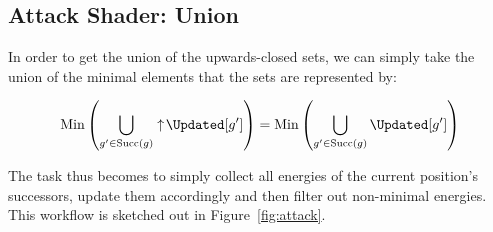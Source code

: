 \subsection{Attack Shader: Union}\label{subsec:attack_shader}

In order to get the union of the upwards-closed sets,
we can simply take the union of the minimal elements
that the sets are represented by:

\[\mathrm{Min} \left( \bigcup_{g' \in \mathrm{Succ}(g)} \upclosed \Updated[g'] \right) =
  \mathrm{Min} \left( \bigcup_{g' \in \mathrm{Succ}(g)}           \Updated[g'] \right)\]

The task thus becomes to simply
collect all energies of the current position's successors,
update them accordingly
and then filter out non-minimal energies.
This workflow is sketched out in Figure~\ref{fig:attack}.

